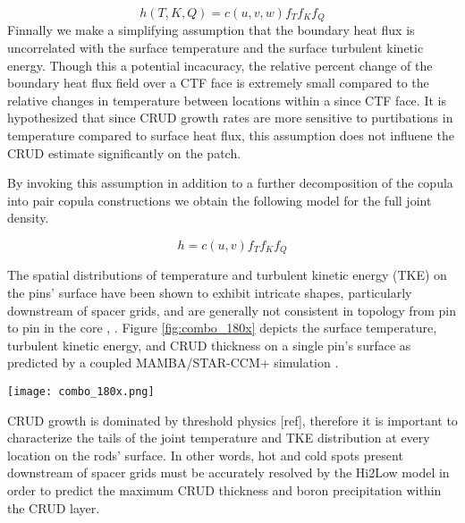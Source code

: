 \documentclass{anstrans}
\begin{document}
\begin{equation}
h(T, K, Q)= c(u, v, w)f_T f_K f_Q
\end{equation}
Finnally we make a simplifying assumption that the boundary heat flux is uncorrelated with the surface temperature and the surface turbulent kinetic energy.  Though this a potential incacuracy, the relative percent change of the boundary heat flux field over a CTF face is extremely small compared to the relative changes in temperature between locations within a since CTF face.  It is hypothesized that since CRUD growth rates are more sensitive to purtibations in temperature compared to surface heat flux, this assumption does not influene the CRUD estimate significantly on the patch.

By invoking this assumption in addition to a further decomposition of the copula into pair copula constructions we obtain the following model for the full joint density.

\begin{equation}
h = c(u,v) f_T f_K f_Q 
\end{equation}


The spatial distributions of temperature and turbulent kinetic energy (TKE) on the pins'
surface have been shown to exhibit intricate shapes, particularly downstream of
spacer grids, and are generally not consistent in topology from pin to pin in the
core \cite{manera16}, \cite{walter16}.  Figure \ref{fig:combo_180x} depicts
the surface temperature, turbulent kinetic energy, and CRUD thickness on a single
pin's surface as predicted by a coupled MAMBA/STAR-CCM+ simulation \cite{slattery16}.

\begin{figure*}[h]
  \texttt{[image: combo\_180x.png]}
  \caption{
    CRUD thickness $[m]$, TKE $[J/kg]$, and surface temperature $[K]$
    distributions provided by STAR-CCM+. A uniform heat flux of $1.102e6 [W/m^2]$
    was applied to the outer rod surface in this case.  Inlet mass flow rate and
    temperature were set at $0.3[kg/s]$ and $565.86[K]$ respectively \cite{slattery16}.}
    \label{fig:combo_180x}
\end{figure*}


CRUD growth is dominated by threshold physics [ref], therefore it is
important to characterize the tails of the joint temperature and
TKE distribution at every location on the rods' surface.  In other words, hot and cold spots
present downstream of spacer grids must be accurately resolved by the Hi2Low model
in order to predict the maximum CRUD
thickness and boron precipitation within the CRUD layer.  
\end{document}
